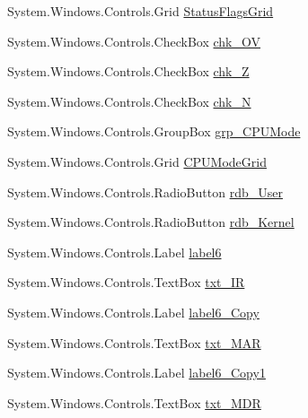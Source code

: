 \begin{DoxyCompactItemize}
\item 
System.\+Windows.\+Controls.\+Grid \hyperlink{class_c_p_u___o_s___simulator_1_1_main_window_afdda5e5a39c6e3b99300284ea2640e7c}{Status\+Flags\+Grid}
\item 
System.\+Windows.\+Controls.\+Check\+Box \hyperlink{class_c_p_u___o_s___simulator_1_1_main_window_adfbc519740506214093673b8015ea67d}{chk\+\_\+\+O\+V}
\item 
System.\+Windows.\+Controls.\+Check\+Box \hyperlink{class_c_p_u___o_s___simulator_1_1_main_window_a70c1a75df218201391cf5e0615a600f1}{chk\+\_\+\+Z}
\item 
System.\+Windows.\+Controls.\+Check\+Box \hyperlink{class_c_p_u___o_s___simulator_1_1_main_window_ab8a23e33c5c71e359574de36ccf8d991}{chk\+\_\+\+N}
\item 
System.\+Windows.\+Controls.\+Group\+Box \hyperlink{class_c_p_u___o_s___simulator_1_1_main_window_a0e549bad0f6778b2ea3fffb6c2d1a2bb}{grp\+\_\+\+C\+P\+U\+Mode}
\item 
System.\+Windows.\+Controls.\+Grid \hyperlink{class_c_p_u___o_s___simulator_1_1_main_window_ab6afb45d3f05517e9df6af167752be77}{C\+P\+U\+Mode\+Grid}
\item 
System.\+Windows.\+Controls.\+Radio\+Button \hyperlink{class_c_p_u___o_s___simulator_1_1_main_window_ab9e8d52c337bc24a24d8282dfbf449c8}{rdb\+\_\+\+User}
\item 
System.\+Windows.\+Controls.\+Radio\+Button \hyperlink{class_c_p_u___o_s___simulator_1_1_main_window_a549c6be690b051f4ab15dce643dec656}{rdb\+\_\+\+Kernel}
\item 
System.\+Windows.\+Controls.\+Label \hyperlink{class_c_p_u___o_s___simulator_1_1_main_window_a8f210008776bb163b4c2c2b160aa52be}{label6}
\item 
System.\+Windows.\+Controls.\+Text\+Box \hyperlink{class_c_p_u___o_s___simulator_1_1_main_window_ac6e0cfcdd72688d7bffd100ce6d11a28}{txt\+\_\+\+I\+R}
\item 
System.\+Windows.\+Controls.\+Label \hyperlink{class_c_p_u___o_s___simulator_1_1_main_window_a18612502a8ab2d53d85434e426785022}{label6\+\_\+\+Copy}
\item 
System.\+Windows.\+Controls.\+Text\+Box \hyperlink{class_c_p_u___o_s___simulator_1_1_main_window_a87f8440246e9f6ace0aa4d69b5bba289}{txt\+\_\+\+M\+A\+R}
\item 
System.\+Windows.\+Controls.\+Label \hyperlink{class_c_p_u___o_s___simulator_1_1_main_window_a890bd54d36af19ec881b6a840d6ac8a9}{label6\+\_\+\+Copy1}
\item 
System.\+Windows.\+Controls.\+Text\+Box \hyperlink{class_c_p_u___o_s___simulator_1_1_main_window_a1aa53d1512aa84e476b3649dcda5ced0}{txt\+\_\+\+M\+D\+R}

\end{DoxyCompactItemize}
